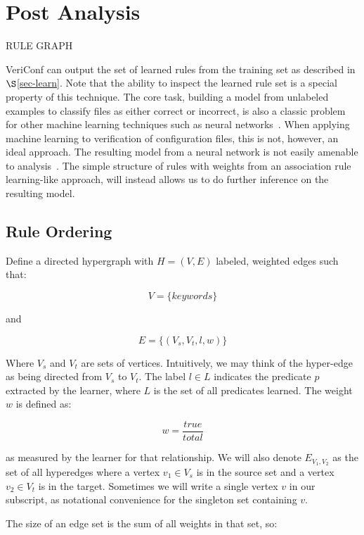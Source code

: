 
\section{Post Analysis}

RULE GRAPH

VeriConf can output the set of learned rules from the training set as described in $\S$\ref{sec-learn}.
Note that the ability to inspect the learned rule set is a special property of this technique.
The core task, building a model from unlabeled examples to classify files as either correct or incorrect, is also a classic problem for other machine learning techniques such as neural networks~\cite{nn1,nn2,nn3}.
When applying machine learning to verification of configuration files, this is not, however, an ideal approach.
The resulting model from a neural network is not easily amenable to analysis~\cite{nnAnalysis1,nnAnalysis2}.
The simple structure of rules with weights from an association rule learning-like approach, will instead allows us to do further inference on the resulting model.

\subsection{Rule Ordering}
\label{sec:ruleorder}

Define a directed hypergraph with $H = (V,E)$ labeled, weighted edges such that:

    $$V = \{ keywords \}$$

and 

    $$E = \{ (V_s, V_t, l, w) \}$$

Where $V_s$ and $V_t$ are sets of vertices. Intuitively, we may think of the
hyper-edge as being directed from $V_s$ to $V_t$. The label $l \in L$ indicates
the predicate $p$ extracted by the learner, where $L$ is the set of all
predicates learned. The weight $w$ is defined as:

    $$w = \frac{true}{total}$$

as measured by the learner for that relationship. We will also denote
$E_{V_1, V_2}$ as
the set of all hyperedges where a vertex $v_1 \in V_s$ is in the 
source set and a vertex $v_2 \in V_t$ is in the target. Sometimes we
will write a single vertex $v$ in our subscript, as notational convenience
for the singleton set containing $v$.

The size of an edge set is the sum of all weights in that set, so:

